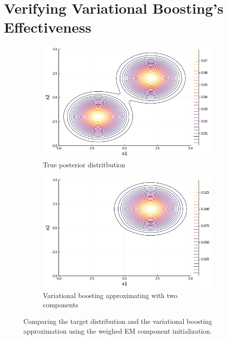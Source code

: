 

\section{Verifying Variational Boosting's Effectiveness} \label{sec:verify}

\begin{figure}[H]
\centering
\begin{subfigure}{0.45\textwidth}
\includegraphics[width=1\linewidth]{../../plot/true_post_far.png}
\caption{True posterior distritbution}
\end{subfigure}
\begin{subfigure}{0.45\textwidth}
\includegraphics[width=1\linewidth]{../../plot/approx_post_far.png}
\caption{Variational boosting approximating with two components}
\end{subfigure}
\caption{Comparing the target distribution and the variational boosting approximation using the weighed EM component initialization.}
\end{figure}

